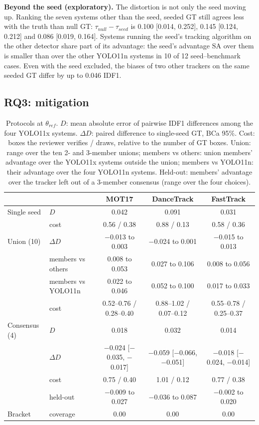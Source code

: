 \documentclass[final,times,twocolumn]{elsarticle}
\newcommand{\SA}{\mathrm{SA}}
\begin{document}
\textbf{Beyond the seed (exploratory).} The distortion is not only the seed moving up. Ranking the seven
systems other than the seed, seeded GT still agrees less with the truth than null GT:
$\tau_{null} - \tau_{seed}$ is 0.100 [0.014, 0.252], 0.145 [0.124, 0.212] and 0.086 [0.019, 0.164]. Systems
running the seed's tracking algorithm on the other detector share part of its advantage: the seed's
advantage $\SA$ over them is smaller than over the other YOLO11n systems in 10 of 12 seed--benchmark cases.
Even with the seed excluded, the biases of two other trackers on the same seeded GT differ by up to 0.046
IDF1.

\subsection{RQ3: mitigation}

\begin{table}[!t]
\centering
\caption{Protocols at $\theta_{ref}$. $D$: mean absolute error of pairwise IDF1 differences among the four
YOLO11x systems. $\Delta D$: paired difference to single-seed GT, BCa 95\%. Cost: boxes the reviewer verifies
/ draws, relative to the number of GT boxes. Union: range over the ten 2- and 3-member unions; members vs others: union members' advantage over the
YOLO11x systems outside the union; members vs YOLO11n: their advantage over the four YOLO11n systems.
Held-out: members' advantage over the tracker left out of a 3-member consensus (range over the four
choices).}
\label{tab:h3}
\small
\setlength{\tabcolsep}{3pt}
\begin{tabular}{@{}llccc@{}}
\toprule
 & & MOT17 & DanceTrack & FastTrack \\
\midrule
Single seed & $D$ & 0.042 & 0.091 & 0.031 \\
 & cost & 0.56 / 0.38 & 0.88 / 0.13 & 0.58 / 0.36 \\
Union (10) & $\Delta D$ & $-$0.013 to 0.003 & $-$0.024 to 0.001 & $-$0.015 to 0.013 \\
 & members vs others & 0.008 to 0.053 & 0.027 to 0.106 & 0.008 to 0.056 \\
 & members vs YOLO11n & 0.022 to 0.046 & 0.052 to 0.100 & 0.017 to 0.033 \\
 & cost & 0.52--0.76 / 0.28--0.40 & 0.88--1.02 / 0.07--0.12 & 0.55--0.78 / 0.25--0.37 \\
Consensus (4) & $D$ & 0.018 & 0.032 & 0.014 \\
 & $\Delta D$ & $-$0.024 [$-$0.035, $-$0.017] & $-$0.059 [$-$0.066, $-$0.051] & $-$0.018 [$-$0.024, $-$0.014] \\
 & cost & 0.75 / 0.40 & 1.01 / 0.12 & 0.77 / 0.38 \\
 & held-out & $-$0.009 to 0.027 & $-$0.036 to 0.087 & $-$0.002 to 0.020 \\
Bracket & coverage & 0.00 & 0.00 & 0.00 \\
\bottomrule
\end{tabular}
\end{table}
\end{document}
